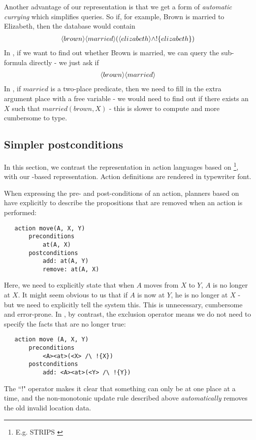 Another advantage of our representation is that we get a form of \emph{automatic currying} which simplifies queries.
So if, for example, Brown is married to Elizabeth, then the database would contain 
\begin{eqnarray*}
\langle brown \rangle \langle married \rangle (\langle elizabeth \rangle \land ! \{elizabeth\})
\end{eqnarray*}
In \cathoristic{}, if we want to find out whether Brown is married, we can query the sub-formula directly -  we just ask if 
\begin{eqnarray*}
\langle brown \rangle \langle married \rangle \end{eqnarray*}
In \fol, if $married$ is a two-place predicate, then we need to fill in the extra argument place with a free variable - we would need to find out if there exists an $X$ such that $married(brown, X)$ - this is slower to compute and more cumbersome to type. 

\subsection{Simpler postconditions}

In this section, we contrast the representation in action languages based on \fol{}\footnote{E.g. STRIPS \cite{strips}}, with our \cathoristic{}-based representation.
Action definitions are rendered in typewriter font.

When expressing the pre- and post-conditions of an action, planners
based on \fol{} have explicitly to describe the propositions that
are removed when an action is performed:
\begin{verbatim}
   action move(A, X, Y)
       preconditions
           at(A, X)
       postconditions
           add: at(A, Y) 
           remove: at(A, X)
\end{verbatim}
Here, we need to explicitly state that when $A$ moves from $X$ to $Y$, $A$ is no longer at $X$. It might seem obvious to us that if $A$ is now at $Y$, he is no longer at $X$ - but we need to explicitly tell the system this. This is unnecessary, cumbersome and error-prone. In \cathoristic{}, by contrast, the exclusion operator means we do not need to specify the facts that are no longer true:
\begin{verbatim}
   action move (A, X, Y)
       preconditions
           <A><at>(<X> /\ !{X})
       postconditions
           add: <A><at>(<Y> /\ !{Y})
\end{verbatim}
The ``!" operator makes it clear that something can only be at one
place at a time, and the non-monotonic update rule described above
\emph{automatically} removes the old invalid location data.


